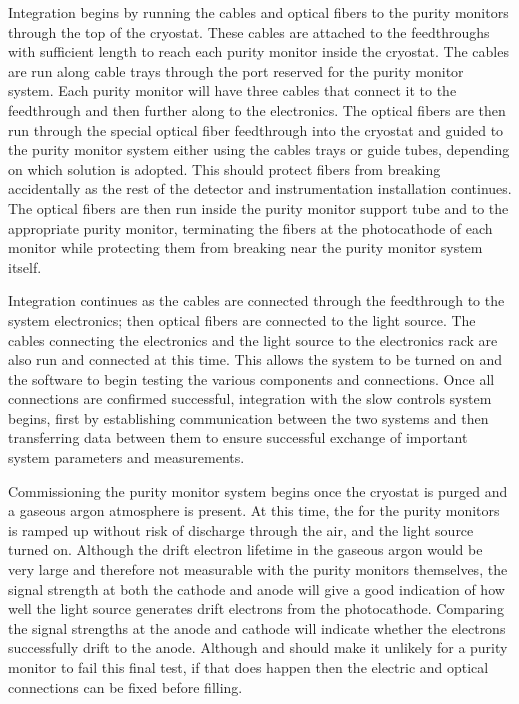 Integration %
begins by running the   cables and optical fibers to the purity monitors through the top of the cryostat.  These cables %
are attached to the    feedthroughs with sufficient length to reach each purity monitor inside the cryostat.  
The cables %
are run along cable trays through the port reserved for the purity monitor system. 
Each purity monitor will have three   cables that connect it to the feedthrough and then further along to the   electronics.  The optical fibers %
are then run through the special optical fiber feedthrough into the cryostat and %
guided to the purity monitor system either using the cables trays or guide tubes, depending on which solution is adopted. 
This should protect fibers from breaking accidentally as the rest of the detector and instrumentation installation continues.  The optical fibers %
are then run inside the purity monitor support tube and to the appropriate purity monitor, terminating the fibers at the photocathode of each monitor while protecting them from breaking near the purity monitor system itself.

Integration %
continues as the   cables are connected through the feedthrough to the system   electronics; then optical fibers are connected to the light source.  The cables connecting the  electronics and the light source to the electronics rack %
are also run and connected at this time.  This allows the system to be turned on and the software to begin testing the various components and connections.  Once all connections are confirmed successful, integration with the slow controls system begins, first by establishing communication between the two systems and then transferring data between them to ensure successful exchange of important system parameters and measurements.  

Commissioning the purity monitor system %
begins once the cryostat is purged and a gaseous argon atmosphere is present.  At this time, the  for the purity monitors 
  is ramped up without risk of discharge through the air, and the light source turned on.  Although the drift electron lifetime in the gaseous argon would be very large and therefore not %
  measurable with the purity monitors themselves, the signal strength at both the cathode and anode will %
  give a good indication of how well the light source generates drift electrons from the photocathode. %
  Comparing the signal strengths at the anode and cathode will indicate whether the electrons successfully drift to the anode.
  Although  and  should make it unlikely for a purity monitor to fail this final test, if that does happen then the electric and optical connections can be fixed before filling.

